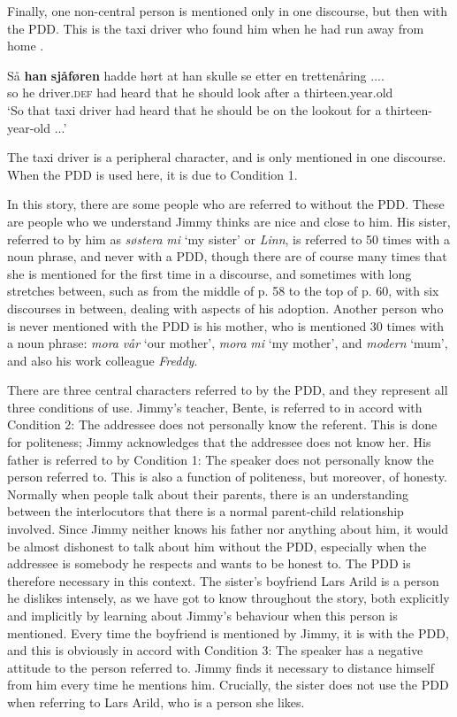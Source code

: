 \documentclass[output=paper,colorlinks,citecolor=brown]{langscibook}
\begin{document}
Finally, one non-central person is mentioned only in one discourse, but then with the PDD. This is the taxi driver who found him when he had run away from home .

\ea\label{ex:johannessen:29}
 \gll Så \textbf{han} \textbf{sjåføren} hadde hørt at han skulle se etter en trettenåring .... \\
     so he driver.\textsc{def} had heard that he should look after a thirteen.year.old\\
\glt ‘So that taxi driver had heard that he should be on the lookout for a thirteen-year-old ...’ \citep[70, middle]{Rishoi2014}
\z

The taxi driver is a peripheral character, and is only mentioned in one discourse. When the PDD is used here, it is due to Condition 1. 

In this story, there are some people who are referred to without the PDD. These are people who we understand Jimmy thinks are nice and close to him. His sister, referred to by him as \textit{søstera} \textit{mi} ‘my sister’ or \textit{Linn}, is referred to 50 times with a noun phrase, and never with a PDD, though there are of course many times that she is mentioned for the first time in a discourse, and sometimes with long stretches between, such as from the middle of p. 58 to the top of p. 60, with six discourses in between, dealing with aspects of his adoption. Another person who is never mentioned with the PDD is his mother, who is mentioned 30 times with a noun phrase: \textit{mora} \textit{vår} ‘our mother’, \textit{mora} \textit{mi} ‘my mother’, and \textit{modern} ‘mum’, and also his work colleague \textit{Freddy}. 

There are three central characters referred to by the PDD, and they represent all three conditions of use. Jimmy’s teacher, Bente, is referred to in accord with Condition 2: The addressee does not personally know the referent. This is done for politeness; Jimmy acknowledges that the addressee does not know her. His father is referred to by Condition 1: The speaker does not personally know the person referred to. This is also a function of politeness, but moreover, of honesty. Normally when people talk about their parents, there is an understanding between the interlocutors that there is a normal parent-child relationship involved. Since Jimmy neither knows his father nor anything about him, it would be almost dishonest to talk about him without the PDD, especially when the addressee is somebody he respects and wants to be honest to. The PDD is therefore necessary in this context. The sister’s boyfriend Lars Arild is a person he dislikes intensely, as we have got to know throughout the story, both explicitly and implicitly by learning about Jimmy’s behaviour when this person is mentioned. Every time the boyfriend is mentioned by Jimmy, it is with the PDD, and this is obviously in accord with Condition 3: The speaker has a negative attitude to the person referred to. Jimmy finds it necessary to distance himself from him every time he mentions him. Crucially, the sister does not use the PDD when referring to Lars Arild, who is a person she likes.
\end{document}
